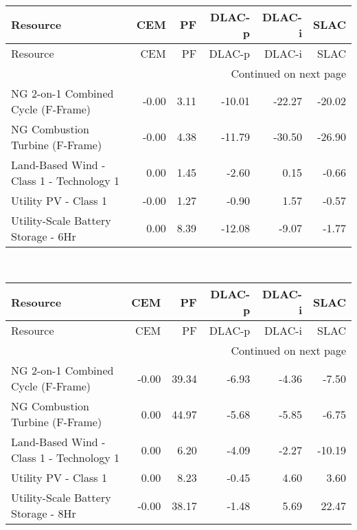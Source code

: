 \documentclass{article}
\begin{document}
\hline
{} \\
\hline
\begin{longtable}{lrrrrr}
\toprule
Resource & CEM & PF & DLAC-p & DLAC-i & SLAC \\
\midrule
\endfirsthead
\toprule
Resource & CEM & PF & DLAC-p & DLAC-i & SLAC \\
\midrule
\endhead
\midrule
\multicolumn{6}{r}{Continued on next page} \\
\midrule
\endfoot
\bottomrule
\endlastfoot
NG 2-on-1 Combined Cycle (F-Frame) & -0.00 & 3.11 & -10.01 & -22.27 & -20.02 \\
NG Combustion Turbine (F-Frame) & -0.00 & 4.38 & -11.79 & -30.50 & -26.90 \\
Land-Based Wind - Class 1 - Technology 1 & 0.00 & 1.45 & -2.60 & 0.15 & -0.66 \\
Utility PV - Class 1 & -0.00 & 1.27 & -0.90 & 1.57 & -0.57 \\
Utility-Scale Battery Storage - 6Hr & 0.00 & 8.39 & -12.08 & -9.07 & -1.77 \\
\end{longtable}


\hline
{} \\
\hline
\begin{longtable}{lrrrrr}
\toprule
Resource & CEM & PF & DLAC-p & DLAC-i & SLAC \\
\midrule
\endfirsthead
\toprule
Resource & CEM & PF & DLAC-p & DLAC-i & SLAC \\
\midrule
\endhead
\midrule
\multicolumn{6}{r}{Continued on next page} \\
\midrule
\endfoot
\bottomrule
\endlastfoot
NG 2-on-1 Combined Cycle (F-Frame) & -0.00 & 39.34 & -6.93 & -4.36 & -7.50 \\
NG Combustion Turbine (F-Frame) & 0.00 & 44.97 & -5.68 & -5.85 & -6.75 \\
Land-Based Wind - Class 1 - Technology 1 & 0.00 & 6.20 & -4.09 & -2.27 & -10.19 \\
Utility PV - Class 1 & 0.00 & 8.23 & -0.45 & 4.60 & 3.60 \\
Utility-Scale Battery Storage - 8Hr & -0.00 & 38.17 & -1.48 & 5.69 & 22.47 \\
\end{longtable}
\end{document}
